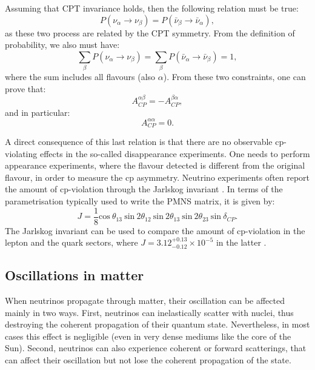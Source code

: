 Assuming that CPT invariance holds, then the following relation must be true:
\begin{equation}
	P(\nu_{\alpha} \rightarrow \nu_{\beta}) = P(\bar{\nu}_{\beta} \rightarrow \bar{\nu}_{\alpha}),
\end{equation}
as these two process are related by the CPT symmetry. From the definition of probability, we also must have:
\begin{equation}
	\sum_{\beta} P(\nu_{\alpha} \rightarrow \nu_{\beta}) = \sum_{\beta} P(\bar{\nu}_{\alpha} \rightarrow \bar{\nu}_{\beta}) = 1,
\end{equation}
where the sum includes all flavours (also $\alpha$). From these two constraints, one can prove that:
\begin{equation}
	A^{\alpha\beta}_{CP} = - A^{\beta\alpha}_{CP},
\end{equation}
and in particular:
\begin{equation}
	A^{\alpha\alpha}_{CP} = 0.
\end{equation}

A direct consequence of this last relation is that there are no observable \gls{cp}-violating effects in the so-called disappearance experiments. One needs to perform appearance experiments, where the flavour detected is different from the original flavour, in order to measure the \gls{cp} asymmetry. Neutrino experiments often report the amount of \gls{cp}-violation through the Jarlskog invariant \cite{Jarlskog1985}. In terms of the parametrisation typically used to write the PMNS matrix, it is given by:
\begin{equation}
	J = \frac{1}{8} \mathrm{cos}~\theta_{13}~\mathrm{sin}~2\theta_{12}~\mathrm{sin}~2\theta_{13}~\mathrm{sin}~2\theta_{23}~\mathrm{sin}~\delta_{CP}.
\end{equation}
The Jarlskog invariant can be used to compare the amount of \gls{cp}-violation in the lepton and the quark sectors, where $J=3.12^{+0.13}_{-0.12} \times 10^{-5}$ in the latter \cite{ParticleDataGroup2024}.

\subsection{Oscillations in matter}

When neutrinos propagate through matter, their oscillation can be affected mainly in two ways. First, neutrinos can inelastically scatter with nuclei, thus destroying the coherent propagation of their quantum state. Nevertheless, in most cases this effect is negligible (even in very dense mediums like the core of the Sun). Second, neutrinos can also experience coherent or forward scatterings, that can affect their oscillation but not lose the coherent propagation of the state.

